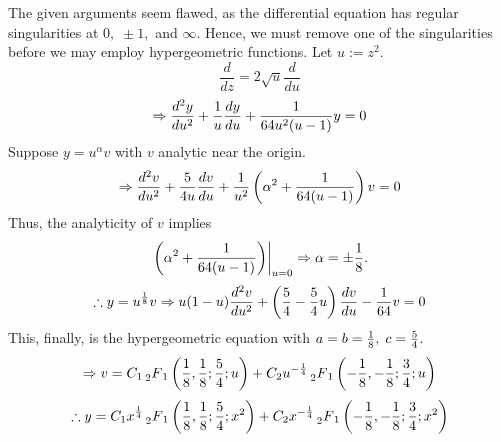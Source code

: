 \item

The given arguments seem flawed, as the differential equation
has regular singularities at $0,\; \pm1,$ and $\infty$.
Hence, we must remove one of the singularities before we may employ hypergeometric functions.
Let $u := z^2$.
\[
    \frac{d}{dz} = 2\sqrt{u} \frac{d}{du}
\]
\[
    \Rightarrow \frac{d^2 y}{du^2} + \frac{1}{u} \frac{dy}{du} + \frac{1}{64 u^2 (u - 1)} y = 0
\]
Suppose $y = u^\alpha v$ with $v$ analytic near the origin.
\[
    \Rightarrow \frac{d^2 v}{du^2}
    + \frac{5}{4u} \frac{dv}{du}
    + \frac{1}{u^2} \left( \alpha^2 + \frac{1}{64(u - 1)} \right) v = 0
\]
Thus, the analyticity of $v$ implies
\[
    {\left. \left( \alpha^2 + \frac{1}{64(u - 1)} \right) \right|}_{u = 0}
    \Rightarrow \alpha = \pm \frac{1}{8}.
\]
\[
    \therefore y = u^{\frac{1}{8}}v
    \Rightarrow u (1-u) \frac{d^2 v}{du^2}
    + \left( \frac{5}{4} - \frac{5}{4}u \right) \frac{dv}{du}
    - \frac{1}{64} v = 0
\]
This, finally, is the hypergeometric equation with $a = b = \frac{1}{8},\; c = \frac{5}{4}$.
\[
    \Rightarrow v
    = C_1 \prescript{}{2}{F}_{1} \left(
        \frac{1}{8}, \frac{1}{8}; \frac{5}{4}; u
    \right) + C_2 u^{-\frac{1}{4}} \prescript{}{2}{F}_{1} \left(
        -\frac{1}{8}, -\frac{1}{8}; \frac{3}{4}; u
    \right)
\]
\[
    \therefore y
    = C_1 x^{\frac{1}{4}} \prescript{}{2}{F}_{1} \left(
        \frac{1}{8}, \frac{1}{8}; \frac{5}{4}; x^2
    \right) + C_2 x^{-\frac{1}{4}} \prescript{}{2}{F}_{1} \left(
        -\frac{1}{8}, -\frac{1}{8}; \frac{3}{4}; x^2
    \right)
\]
